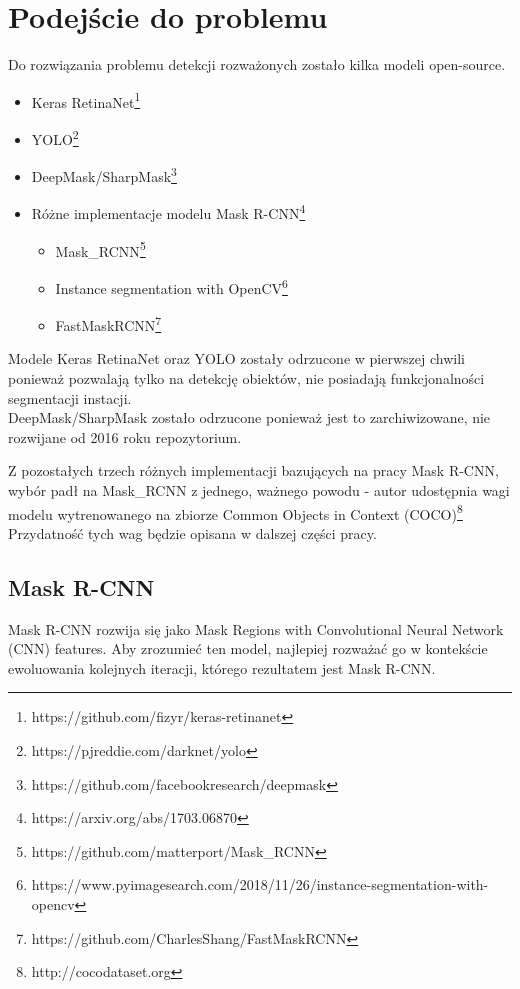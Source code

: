 \chapter{Podejście do problemu}

Do rozwiązania problemu detekcji rozważonych zostało kilka modeli open-source.

\begin{itemize}
	\item Keras RetinaNet\footnote{https://github.com/fizyr/keras-retinanet}
	\item YOLO\footnote{https://pjreddie.com/darknet/yolo}
	\item DeepMask/SharpMask\footnote{https://github.com/facebookresearch/deepmask}
	\item Różne implementacje modelu Mask R-CNN\footnote{https://arxiv.org/abs/1703.06870}
		\begin{itemize}
			\item Mask\_RCNN\footnote{https://github.com/matterport/Mask\_RCNN}
			\item Instance segmentation with OpenCV\footnote{https://www.pyimagesearch.com/2018/11/26/instance-segmentation-with-opencv}
			\item FastMaskRCNN\footnote{https://github.com/CharlesShang/FastMaskRCNN}
		\end{itemize}
\end{itemize}

Modele Keras RetinaNet oraz YOLO zostały odrzucone w pierwszej chwili ponieważ pozwalają tylko na detekcję obiektów, nie posiadają funkcjonalności segmentacji instacji. \\

DeepMask/SharpMask zostało odrzucone ponieważ jest to zarchiwizowane, nie rozwijane od 2016 roku repozytorium.

Z pozostałych trzech różnych implementacji bazujących na pracy Mask R-CNN, wybór padł na Mask\_RCNN z jednego, ważnego powodu - autor udostępnia wagi modelu wytrenowanego na zbiorze Common Objects in Context (COCO)\footnote{http://cocodataset.org} Przydatność tych wag będzie opisana w dalszej części pracy.

\section{Mask R-CNN}

Mask R-CNN rozwija się jako Mask Regions with Convolutional Neural Network (CNN) features. Aby zrozumieć ten model, najlepiej rozważać go w kontekście ewoluowania kolejnych iteracji, którego rezultatem jest Mask R-CNN.


